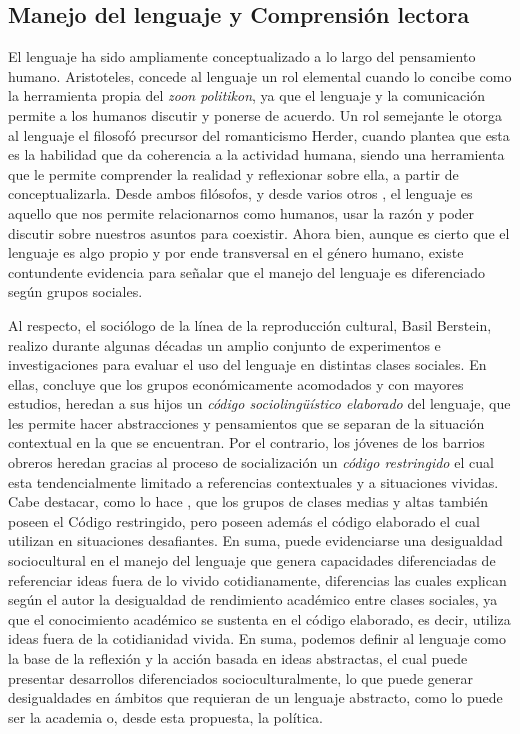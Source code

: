 \documentclass[12pt,twoside]{templates/facsothesis}
\begin{document}
\hypertarget{manejo-del-lenguaje-y-comprensiuxf3n-lectora}{%
\subsection{Manejo del lenguaje y Comprensión lectora}\label{manejo-del-lenguaje-y-comprensiuxf3n-lectora}}

El lenguaje ha sido ampliamente conceptualizado a lo largo del pensamiento humano. Aristoteles, concede al lenguaje un rol elemental cuando lo concibe como la herramienta propia del \emph{zoon politikon}, ya que el lenguaje y la comunicación permite a los humanos discutir y ponerse de acuerdo. Un rol semejante le otorga al lenguaje el filosofó precursor del romanticismo Herder, cuando plantea que esta es la habilidad que da coherencia a la actividad humana, siendo una herramienta que le permite comprender la realidad y reflexionar sobre ella, a partir de conceptualizarla. Desde ambos filósofos, y desde varios otros \citep[ej.][]{echeverria_Ontologia_2011, garcia_LENGUAJE_2013}, el lenguaje es aquello que nos permite relacionarnos como humanos, usar la razón y poder discutir sobre nuestros asuntos para coexistir. Ahora bien, aunque es cierto que el lenguaje es algo propio y por ende transversal en el género humano, existe contundente evidencia para señalar que el manejo del lenguaje es diferenciado según grupos sociales.

Al respecto, el sociólogo de la línea de la reproducción cultural, Basil Berstein, realizo durante algunas décadas un amplio conjunto de experimentos e investigaciones para evaluar el uso del lenguaje en distintas clases sociales. En ellas, \citet{bernstein_CLASES_1985} concluye que los grupos económicamente acomodados y con mayores estudios, heredan a sus hijos un \emph{código sociolingüístico elaborado} del lenguaje, que les permite hacer abstracciones y pensamientos que se separan de la situación contextual en la que se encuentran. Por el contrario, los jóvenes de los barrios obreros heredan gracias al proceso de socialización un \emph{código restringido} el cual esta tendencialmente limitado a referencias contextuales y a situaciones vividas. Cabe destacar, como lo hace \citet{bernstein_Poder_1988}, que los grupos de clases medias y altas también poseen el Código restringido, pero poseen además el código elaborado el cual utilizan en situaciones desafiantes. En suma, puede evidenciarse una desigualdad sociocultural en el manejo del lenguaje que genera capacidades diferenciadas de referenciar ideas fuera de lo vivido cotidianamente, diferencias las cuales explican según el autor la desigualdad de rendimiento académico entre clases sociales, ya que el conocimiento académico se sustenta en el código elaborado, es decir, utiliza ideas fuera de la cotidianidad vivida. En suma, podemos definir al lenguaje como la base de la reflexión y la acción basada en ideas abstractas, el cual puede presentar desarrollos diferenciados socioculturalmente, lo que puede generar desigualdades en ámbitos que requieran de un lenguaje abstracto, como lo puede ser la academia o, desde esta propuesta, la política.
\end{document}
